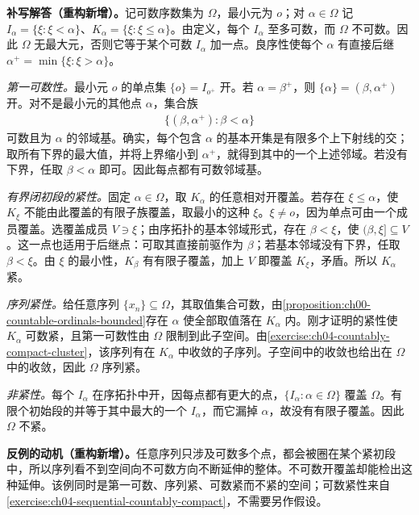 \documentclass[../../main.tex]{subfiles}%
\begin{document}
\begin{solution}
\textbf{补写解答（重构新增）。}记可数序数集为 $\Omega$，最小元为 $o$；对 $\alpha\in\Omega$ 记 $I_\alpha=\{\xi:\xi<\alpha\}$、$K_\alpha=\{\xi:\xi\le\alpha\}$。由定义，每个 $I_\alpha$ 至多可数，而 $\Omega$ 不可数。因此 $\Omega$ 无最大元，否则它等于某个可数 $I_\alpha$ 加一点。良序性使每个 $\alpha$ 有直接后继 $\alpha^+=\min\{\xi:\xi>\alpha\}$。

\emph{第一可数性。}最小元 $o$ 的单点集 $\{o\}=I_{o^+}$ 开。若 $\alpha=\beta^+$，则 $\{\alpha\}=(\beta,\alpha^+)$ 开。对不是最小元的其他点 $\alpha$，集合族
\begin{align*}
\{(\beta,\alpha^+):\beta<\alpha\}
\end{align*}
可数且为 $\alpha$ 的邻域基。确实，每个包含 $\alpha$ 的基本开集是有限多个上下射线的交；取所有下界的最大值，并将上界缩小到 $\alpha^+$，就得到其中的一个上述邻域。若没有下界，任取 $\beta<\alpha$ 即可。因此每点都有可数邻域基。

\emph{有界闭初段的紧性。}固定 $\alpha\in\Omega$，取 $K_\alpha$ 的任意相对开覆盖。若存在 $\xi\le\alpha$，使 $K_\xi$ 不能由此覆盖的有限子族覆盖，取最小的这种 $\xi$。$\xi\ne o$，因为单点可由一个成员覆盖。选覆盖成员 $V\ni\xi$；由序拓扑的基本邻域形式，存在 $\beta<\xi$，使 $(\beta,\xi]\subseteq V$。这一点也适用于后继点：可取其直接前驱作为 $\beta$；若基本邻域没有下界，任取 $\beta<\xi$。由 $\xi$ 的最小性，$K_\beta$ 有有限子覆盖，加上 $V$ 即覆盖 $K_\xi$，矛盾。所以 $K_\alpha$ 紧。

\emph{序列紧性。}给任意序列 $\{x_n\}\subseteq\Omega$，其取值集合可数，由\cref{proposition:ch00-countable-ordinals-bounded}存在 $\alpha$ 使全部取值落在 $K_\alpha$ 内。刚才证明的紧性使 $K_\alpha$ 可数紧，且第一可数性由 $\Omega$ 限制到此子空间。由\cref{exercise:ch04-countably-compact-cluster}，该序列有在 $K_\alpha$ 中收敛的子序列。子空间中的收敛也给出在 $\Omega$ 中的收敛，因此 $\Omega$ 序列紧。

\emph{非紧性。}每个 $I_\alpha$ 在序拓扑中开，因每点都有更大的点，$\{I_\alpha:\alpha\in\Omega\}$ 覆盖 $\Omega$。有限个初始段的并等于其中最大的一个 $I_\alpha$，而它漏掉 $\alpha$，故没有有限子覆盖。因此 $\Omega$ 不紧。
\end{solution}
\begin{remark}
\textbf{反例的动机（重构新增）。}任意序列只涉及可数多个点，都会被圈在某个紧初段中，所以序列看不到空间向不可数方向不断延伸的整体。不可数开覆盖却能检出这种延伸。该例同时是第一可数、序列紧、可数紧而不紧的空间；可数紧性来自\cref{exercise:ch04-sequential-countably-compact}，不需要另作假设。
\end{remark}
\end{document}
